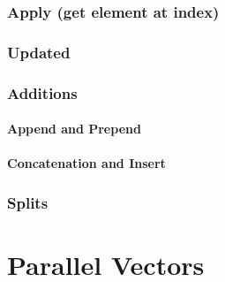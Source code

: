 
\subsubsection{Apply (get element at index)}




\subsubsection{Updated}



\subsubsection{Additions}

\paragraph{Append and Prepend}

\paragraph{Concatenation and Insert}



\subsubsection{Splits}



\section{Parallel Vectors}

